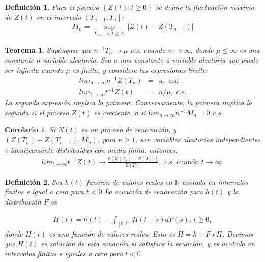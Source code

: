 \documentclass{article}
\newtheorem{Def}{Definición}
\newtheorem{Teo}{Teorema}
\newtheorem{Coro}{Corolario}
\newcommand{\rea}{\mathbb{R}}
\newcommand{\esp}{\mathbb{E}}
\begin{document}
\begin{Def}
Para el proceso $\left\{Z\left(t\right):t\geq0\right\}$ se define la fluctuaci\'on m\'axima de $Z\left(t\right)$ en el intervalo $\left(T_{n-1},T_{n}\right]$:
\begin{eqnarray*}
M_{n}=\sup_{T_{n-1}<t\leq T_{n}}|Z\left(t\right)-Z\left(T_{n-1}\right)|
\end{eqnarray*}
\end{Def}

\begin{Teo}
Sup\'ongase que $n^{-1}T_{n}\rightarrow\mu$ c.s. cuando $n\rightarrow\infty$, donde $\mu\leq\infty$ es una constante o variable aleatoria. Sea $a$ una constante o variable aleatoria que puede ser infinita cuando $\mu$ es finita, y considere las expresiones l\'imite:
\begin{eqnarray}
lim_{n\rightarrow\infty}n^{-1}Z\left(T_{n}\right)&=&a,\textrm{ c.s.}\\
lim_{t\rightarrow\infty}t^{-1}Z\left(t\right)&=&a/\mu,\textrm{ c.s.}
\end{eqnarray}
La segunda expresi\'on implica la primera. Conversamente, la primera implica la segunda si el proceso $Z\left(t\right)$ es creciente, o si $lim_{n\rightarrow\infty}n^{-1}M_{n}=0$ c.s.
\end{Teo}

\begin{Coro}
Si $N\left(t\right)$ es un proceso de renovaci\'on, y $\left(Z\left(T_{n}\right)-Z\left(T_{n-1}\right),M_{n}\right)$, para $n\geq1$, son variables aleatorias independientes e id\'enticamente distribuidas con media finita, entonces,
\begin{eqnarray}
lim_{t\rightarrow\infty}t^{-1}Z\left(t\right)\rightarrow\frac{\esp\left[Z\left(T_{1}\right)-Z\left(T_{0}\right)\right]}{\esp\left[T_{1}\right]},\textrm{ c.s. cuando  }t\rightarrow\infty.
\end{eqnarray}
\end{Coro}


%
%


\begin{Def}
Sea $h\left(t\right)$ funci\'on de valores reales en $\rea$ acotada en intervalos finitos e igual a cero para $t<0$ La ecuaci\'on de renovaci\'on para $h\left(t\right)$ y la distribuci\'on $F$ es

\begin{eqnarray}%
H\left(t\right)=h\left(t\right)+\int_{\left[0,t\right]}H\left(t-s\right)dF\left(s\right)\textrm{,    }t\geq0,
\end{eqnarray}
donde $H\left(t\right)$ es una funci\'on de valores reales. Esto es $H=h+F\star H$. Decimos que $H\left(t\right)$ es soluci\'on de esta ecuaci\'on si satisface la ecuaci\'on, y es acotada en intervalos finitos e iguales a cero para $t<0$.
\end{Def}
\end{document}
